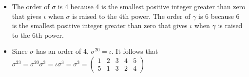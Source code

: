 \documentclass[titlepage]{article}
\newenvironment{problem}[2][Problem]{\begin{trivlist}
\item[\hskip \labelsep {\bfseries #1}\hskip \labelsep {\bfseries #2.}]}{\end{trivlist}}
\begin{document}
\begin{problem}{8}
\begin{itemize}
\item[(b)] The order of $\sigma$ is 4 because 4 is the smallest positive integer greater than zero that gives $\iota$ when $\sigma$ is raised to the 4th power. The order of $\gamma$ is 6 because 6 is the smallest positive integer greater than zero that gives $\iota$ when $\gamma$ is raised to the 6th power.

\item[(c)] Since $\sigma$ has an order of 4, $\sigma^{20} = \iota$. It follows that $\sigma^{23} = \sigma^{20}\sigma^3 =\iota\sigma^3 = \sigma^3 = \left(\begin{smallmatrix} 1 & 2 & 3 & 4 & 5 \\  5 & 1 & 3 & 2 & 4 \end{smallmatrix}\right)$
\end{itemize}
\end{problem}
\end{document}
